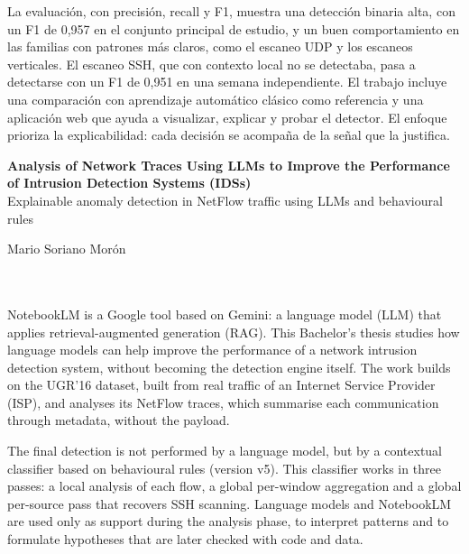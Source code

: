 La evaluación, con precisión, recall y F1, muestra una detección binaria alta, con un F1 de 0,957 en el conjunto principal de estudio, y un buen comportamiento en las familias con patrones más claros, como el escaneo UDP y los escaneos verticales. El escaneo SSH, que con contexto local no se detectaba, pasa a detectarse con un F1 de 0,951 en una semana independiente. El trabajo incluye una comparación con aprendizaje automático clásico como referencia y una aplicación web que ayuda a visualizar, explicar y probar el detector. El enfoque prioriza la explicabilidad: cada decisión se acompaña de la señal que la justifica.

\clearpage
\thispagestyle{empty}

\begin{center}
{\large\bfseries Analysis of Network Traces Using LLMs to Improve the Performance of Intrusion Detection Systems (IDSs)}\\[0.3cm]
{\normalsize Explainable anomaly detection in NetFlow traffic using LLMs and behavioural rules}\\
\end{center}
\begin{center}
Mario Soriano Morón\\
\end{center}

\\

\vspace{0.7cm}
\\

NotebookLM is a Google tool based on Gemini: a language model (LLM) that applies retrieval-augmented generation (RAG). This Bachelor's thesis studies how language models can help improve the performance of a network intrusion detection system, without becoming the detection engine itself. The work builds on the UGR'16 dataset, built from real traffic of an Internet Service Provider (ISP), and analyses its NetFlow traces, which summarise each communication through metadata, without the payload.

The final detection is not performed by a language model, but by a contextual classifier based on behavioural rules (version v5). This classifier works in three passes: a local analysis of each flow, a global per-window aggregation and a global per-source pass that recovers SSH scanning. Language models and NotebookLM are used only as support during the analysis phase, to interpret patterns and to formulate hypotheses that are later checked with code and data.

